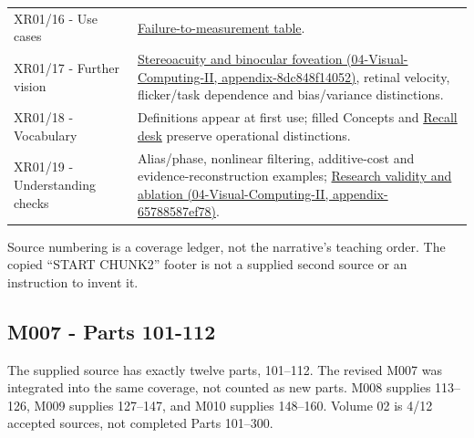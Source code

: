 {\begin{longtable}[]{@{}
  >{\raggedright\arraybackslash}p{}
  >{\raggedright\arraybackslash}p{}@{}}
XR01/16 - Use cases & \href{Continuous\%20Notes/University\%20-\%20Worlds,\%20Images\%20and\%20Inference\%20-\%20Graphics,\%20Vision\%20and\%20Photography\#Diagnose\%20a\%20symptom\%20by\%20the\%20quantity\%20that\%20failed/}{Failure-to-measurement table}. \\
XR01/17 - Further vision & \href{}{Stereoacuity and binocular foveation (04-Visual-Computing-II, appendix-8dc848f14052)}, retinal velocity, flicker/task dependence and bias/variance distinctions. \\
XR01/18 - Vocabulary & Definitions appear at first use; filled Concepts and \href{Continuous\%20Notes/University\%20-\%20Worlds,\%20Images\%20and\%20Inference\%20-\%20Graphics,\%20Vision\%20and\%20Photography\#Teach\%20the\%20distinctions\%20from\%20a\%20blank\%20board/}{Recall desk} preserve operational distinctions. \\
XR01/19 - Understanding checks & Alias/phase, nonlinear filtering, additive-cost and evidence-reconstruction examples; \href{}{Research validity and ablation (04-Visual-Computing-II, appendix-65788587ef78)}. \\
\end{longtable}
}

Source numbering is a coverage ledger, not the narrative's teaching order. The copied ``START CHUNK2'' footer is not a supplied second source or an instruction to invent it.

\subsection{M007 - Parts 101-112}\label{m007---parts-101-112}

The supplied source has exactly twelve parts, 101--112. The revised M007 was integrated into the same coverage, not counted as new parts. M008 supplies 113--126, M009 supplies 127--147, and M010 supplies 148--160. Volume 02 is 4/12 accepted sources, not completed Parts 101--300.

